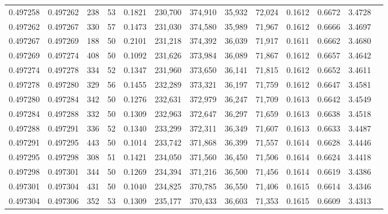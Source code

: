 \begin{tabular}{rrrrrrrrrrrrr}
0.497258 & 0.497262 & 238 &  53 &                                     0.1821 & 230,700 & 374,910 &  35,932 &  72,024 & 0.1612 & 0.6672 & 3.4728 \\
0.497262 & 0.497267 & 330 &  57 &                                     0.1473 & 231,030 & 374,580 &  35,989 &  71,967 & 0.1612 & 0.6666 & 3.4697 \\
0.497267 & 0.497269 & 188 &  50 &                                     0.2101 & 231,218 & 374,392 &  36,039 &  71,917 & 0.1611 & 0.6662 & 3.4680 \\
0.497269 & 0.497274 & 408 &  50 &                                     0.1092 & 231,626 & 373,984 &  36,089 &  71,867 & 0.1612 & 0.6657 & 3.4642 \\
0.497274 & 0.497278 & 334 &  52 &                                     0.1347 & 231,960 & 373,650 &  36,141 &  71,815 & 0.1612 & 0.6652 & 3.4611 \\
0.497278 & 0.497280 & 329 &  56 &                                     0.1455 & 232,289 & 373,321 &  36,197 &  71,759 & 0.1612 & 0.6647 & 3.4581 \\
0.497280 & 0.497284 & 342 &  50 &                                     0.1276 & 232,631 & 372,979 &  36,247 &  71,709 & 0.1613 & 0.6642 & 3.4549 \\
0.497284 & 0.497288 & 332 &  50 &                                     0.1309 & 232,963 & 372,647 &  36,297 &  71,659 & 0.1613 & 0.6638 & 3.4518 \\
0.497288 & 0.497291 & 336 &  52 &                                     0.1340 & 233,299 & 372,311 &  36,349 &  71,607 & 0.1613 & 0.6633 & 3.4487 \\
0.497291 & 0.497295 & 443 &  50 &                                     0.1014 & 233,742 & 371,868 &  36,399 &  71,557 & 0.1614 & 0.6628 & 3.4446 \\
0.497295 & 0.497298 & 308 &  51 &                                     0.1421 & 234,050 & 371,560 &  36,450 &  71,506 & 0.1614 & 0.6624 & 3.4418 \\
0.497298 & 0.497301 & 344 &  50 &                                     0.1269 & 234,394 & 371,216 &  36,500 &  71,456 & 0.1614 & 0.6619 & 3.4386 \\
0.497301 & 0.497304 & 431 &  50 &                                     0.1040 & 234,825 & 370,785 &  36,550 &  71,406 & 0.1615 & 0.6614 & 3.4346 \\
0.497304 & 0.497306 & 352 &  53 &                                     0.1309 & 235,177 & 370,433 &  36,603 &  71,353 & 0.1615 & 0.6609 & 3.4313 \\

\end{tabular}
